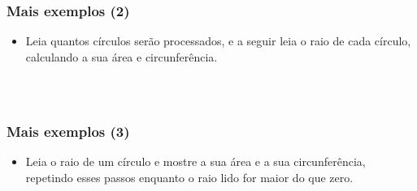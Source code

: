 \documentclass[xcolor={dvipsnames,table},aspectratio=169]{beamer}
\begin{document}
\begin{frame}[fragile]\frametitle{Mais exemplos (2)}
\begin{itemize}
	\item 
Leia quantos círculos serão processados, e a seguir leia o raio de cada círculo, calculando a sua área e circunferência.\\
	{\tiny\inputminted[bgcolor=cyan!10]{java}{src/Circulo2.java}}\\
\end{itemize}
\end{frame}

\begin{frame}[fragile]\frametitle{Mais exemplos (3)}
\begin{itemize}
	\item Leia o raio de um círculo e mostre a sua área e a sua circunferência, repetindo esses passos enquanto o raio lido for maior do que zero.
	{\tiny\inputminted[bgcolor=cyan!10]{java}{src/Circulo3.java}}\\
\end{itemize}
\end{frame}
\end{document}
